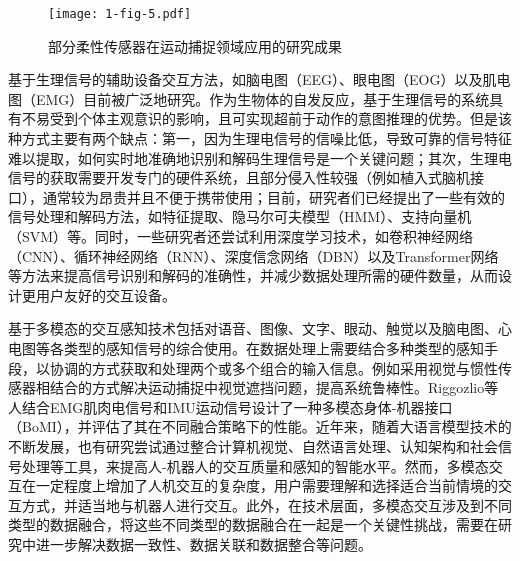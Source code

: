 \begin{figure}[h]
  \centering
  \texttt{[image: 1-fig-5.pdf]}
  \caption{部分柔性传感器在运动捕捉领域应用的研究成果}
  \label{fig:1-4}
\end{figure}

基于生理信号的辅助设备交互方法，如脑电图（EEG）、眼电图（EOG）以及肌电图（EMG）目前被广泛地研究。作为生物体的自发反应，基于生理信号的系统具有不易受到个体主观意识的影响，且可实现超前于动作的意图推理的优势。但是该种方式主要有两个缺点：第一，因为生理电信号的信噪比低，导致可靠的信号特征难以提取，如何实时地准确地识别和解码生理信号是一个关键问题；其次，生理电信号的获取需要开发专门的硬件系统，且部分侵入性较强（例如植入式脑机接口），通常较为昂贵并且不便于携带使用\cite{blabeAssessmentBrainMachine2015a,collingerFunctionalPrioritiesAssistive2013a}；目前，研究者们已经提出了一些有效的信号处理和解码方法，如特征提取\cite{phinyomarkFeatureExtractionSelection2018}、隐马尔可夫模型（HMM）\cite{chaurasiyaSequentialStudyEmotions2019}、支持向量机（SVM）\cite{richhariyaEEGSignalClassification2018}等。同时，一些研究者还尝试利用深度学习技术，如卷积神经网络（CNN）\cite{briouzaConvolutionalNeuralNetworkBased2021}、循环神经网络（RNN）\cite{suppiahFuzzyInferenceSystem2022}、深度信念网络（DBN）\cite{zhengEEGbasedEmotionClassification2014}以及Transformer网络\cite{montazerinTransformerbasedHandGesture2023,wanEEGformerTransformerBased2023}等方法来提高信号识别和解码的准确性，并减少数据处理所需的硬件数量，从而设计更用户友好的交互设备。

基于多模态的交互感知技术包括对语音、图像、文字、眼动、触觉以及脑电图、心电图等各类型的感知信号的综合使用\cite{suRecentAdvancementsMultimodal2023}。在数据处理上需要结合多种类型的感知手段，以协调的方式获取和处理两个或多个组合的输入信息。例如采用视觉与惯性传感器相结合的方式解决运动捕捉中视觉遮挡问题\cite{mallesonRealTimeFullBodyMotion2017,moniruzzamanWearableMotionCapture2023}，提高系统鲁棒性。Riggozlio等人\cite{rizzoglioHybridBodyMachineInterface2020}结合EMG肌肉电信号和IMU运动信号设计了一种多模态身体-机器接口（BoMI），并评估了其在不同融合策略下的性能。近年来，随着大语言模型技术的不断发展，也有研究尝试通过整合计算机视觉、自然语言处理、认知架构和社会信号处理等工具，来提高人-机器人的交互质量和感知的智能水平\cite{dongHuBoVLMUnifiedVisionLanguage2023,huangVoxPoserComposable3D2023,gaoPhysicallyGroundedVisionLanguage2023}。然而，多模态交互在一定程度上增加了人机交互的复杂度，用户需要理解和选择适合当前情境的交互方式，并适当地与机器人进行交互。此外，在技术层面，多模态交互涉及到不同类型的数据融合，将这些不同类型的数据融合在一起是一个关键性挑战，需要在研究中进一步解决数据一致性、数据关联和数据整合等问题。

